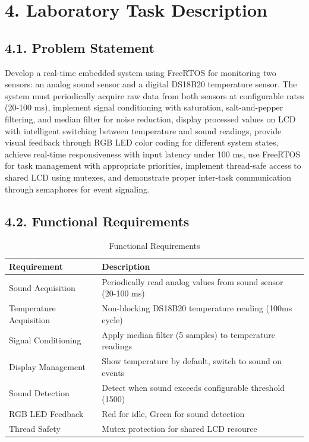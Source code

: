 \documentclass[12pt]{article}
\begin{document}
\section*{4. Laboratory Task Description}

\subsection*{4.1. Problem Statement}

Develop a real-time embedded system using FreeRTOS for monitoring two sensors: an analog sound sensor and a digital DS18B20 temperature sensor. The system must periodically acquire raw data from both sensors at configurable rates (20-100 ms), implement signal conditioning with saturation, salt-and-pepper filtering, and median filter for noise reduction, display processed values on LCD with intelligent switching between temperature and sound readings, provide visual feedback through RGB LED color coding for different system states, achieve real-time responsiveness with input latency under 100 ms, use FreeRTOS for task management with appropriate priorities, implement thread-safe access to shared LCD using mutexes, and demonstrate proper inter-task communication through semaphores for event signaling.

\subsection*{4.2. Functional Requirements}

\begin{table}[H]
	\centering
	\caption{Functional Requirements}
	\label{tab:functional-requirements}
	\begin{tabular}{|l|l|}
		\hline
		\textbf{Requirement} & \textbf{Description} \\
		\hline
		Sound Acquisition & Periodically read analog values from sound sensor (20-100 ms) \\
		\hline
		Temperature Acquisition & Non-blocking DS18B20 temperature reading (100ms cycle) \\
		\hline
		Signal Conditioning & Apply median filter (5 samples) to temperature readings \\
		\hline
		Display Management & Show temperature by default, switch to sound on events \\
		\hline
		Sound Detection & Detect when sound exceeds configurable threshold (1500) \\
		\hline
		RGB LED Feedback & Red for idle, Green for sound detection \\
		\hline
		Thread Safety & Mutex protection for shared LCD resource \\
		\hline
	\end{tabular}
\end{table}
\end{document}
